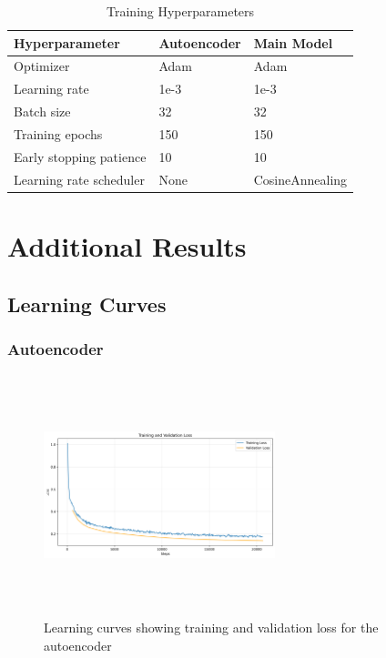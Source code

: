 \begin{table}[h]
    \centering
    \caption{Training Hyperparameters}
    \begin{tabular}{lll}
        \toprule
        Hyperparameter          & Autoencoder & Main Model      \\
        \midrule
        Optimizer               & Adam        & Adam            \\
        Learning rate           & 1e-3        & 1e-3            \\
        Batch size              & 32          & 32              \\
        Training epochs         & 150         & 150             \\
        Early stopping patience & 10          & 10              \\
        Learning rate scheduler & None        & CosineAnnealing \\
        \bottomrule
    \end{tabular}
    \label{tab:training_hyperparameters}
\end{table}

\section{Additional Results}

\subsection{Learning Curves}

\subsubsection{Autoencoder}
\begin{figure}[H]
    \centering
    \includegraphics[height=7cm,width=0.6\textwidth]{../results/autoencoder-new/loss_plot.png}
    \caption{Learning curves showing training and validation loss for the autoencoder}
    \label{fig:autoencoder_loss}
\end{figure}

